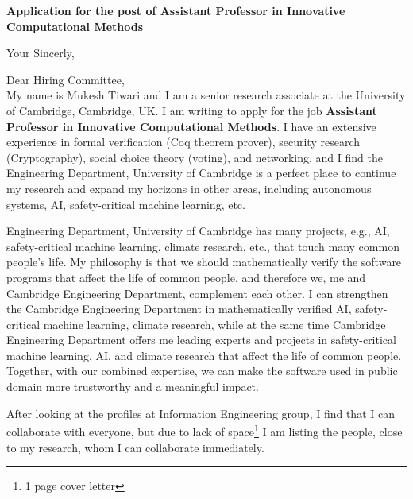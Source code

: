 \documentclass[11pt,a4paper,roman]{moderncv}
\begin{document}
\date{}
\opening{\textbf{Application for the post of Assistant Professor in Innovative Computational Methods}}
\closing{Your Sincerly, \vspace{-1em}}



\makelettertitle


Dear Hiring Committee, 
\\
\vspace{1em}
My name is Mukesh Tiwari and  I am a senior research associate at 
the University of Cambridge, Cambridge, UK. 
I am writing to apply
for the job \textbf{Assistant Professor in Innovative Computational Methods}. 
I have an extensive experience in
formal verification (Coq theorem prover), security research (Cryptography), 
social choice theory (voting), and networking, 
and I find the Engineering Department, University of Cambridge is 
a perfect place to continue my research and expand my horizons in other areas,  
including autonomous systems, AI, safety-critical machine learning, etc.



\vspace{0.5cm}
Engineering Department, University of Cambridge has many projects, e.g., AI, safety-critical 
machine learning, climate research,  etc., that touch many common people's life.
My philosophy is that we should mathematically verify the software programs 
that affect the life of common people, and therefore we, me and 
Cambridge Engineering Department, complement each other.
I can strengthen the Cambridge Engineering 
Department in mathematically verified AI, safety-critical machine learning, 
climate research, while 
at the same time Cambridge Engineering Department offers me leading experts 
and projects  in safety-critical machine learning, AI, and climate research
that affect the life of common people. Together, with our combined expertise, 
we can make the software used in public domain more trustworthy and 
a meaningful impact. 

After looking at the profiles at Information Engineering group, I find that I can 
collaborate with everyone, but due to lack of space\footnote{1 page cover letter}  
I am listing the people, close to my research, whom I can collaborate 
immediately. 
\end{document}

